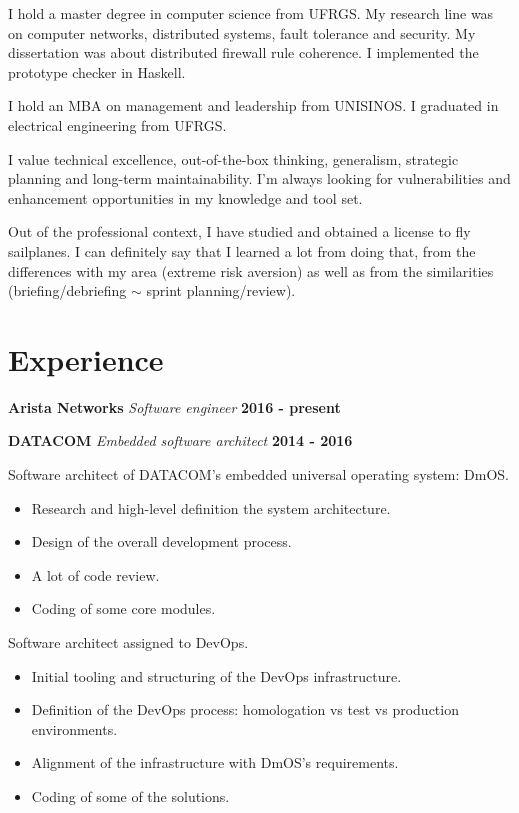 \documentclass[margin,line]{resume}
\providecommand{\tightlist}{\setlength{\itemsep}{0pt}\setlength{\parskip}{0pt}}
\begin{document}
\begin{resume}
I hold a master degree in computer science from UFRGS. My research line
was on computer networks, distributed systems, fault tolerance and
security. My dissertation was about distributed firewall rule coherence.
I implemented the prototype checker in Haskell.

I hold an MBA on management and leadership from UNISINOS. I graduated in
electrical engineering from UFRGS.

I value technical excellence, out-of-the-box thinking, generalism,
strategic planning and long-term maintainability. I'm always looking for
vulnerabilities and enhancement opportunities in my knowledge and tool
set.

Out of the professional context, I have studied and obtained a license
to fly sailplanes. I can definitely say that I learned a lot from doing
that, from the differences with my area (extreme risk aversion) as well
as from the similarities (briefing/debriefing \(\sim\) sprint
planning/review).



    \section{\mysidestyle Experience}

    

    

    \textbf{Arista Networks} \nl{}
    \textsl{Software engineer} \hfill \textbf{2016 - present}

    

    

    
    \clearpage
    

    \textbf{DATACOM} \nl{}
    \textsl{Embedded software architect} \hfill \textbf{2014 - 2016}

    Software architect of DATACOM's embedded universal operating system:
DmOS.
\begin{itemize}
\tightlist
\item
  Research and high-level definition the system architecture.
\item
  Design of the overall development process.
\item
  A lot of code review.
\item
  Coding of some core modules.
\end{itemize}

Software architect assigned to DevOps.
\begin{itemize}
\tightlist
\item
  Initial tooling and structuring of the DevOps infrastructure.
\item
  Definition of the DevOps process: homologation vs test vs production
  environments.
\item
  Alignment of the infrastructure with DmOS's requirements.
\item
  Coding of some of the solutions.
\end{itemize}



\end{resume}
\end{document}

